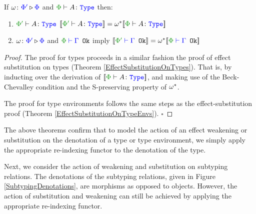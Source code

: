 \begin{framed}
    \begin{theorem}\label{EffectWeakeningOnTypes}  
        If $\omega \colon {\color{blue}\Phi'} \triangleright {\color {blue} \Phi}$ and $\wellformedtype{\P}{A}$ then:
        \begin{enumerate}[label=\roman*.]
            \item $\wellformedtype{\P'}{A}$ $\deno{\wellformedtype{\P'}{A}} = \w\star\deno{\wellformedtype{\P}{A}}$
            \item $\omega \colon {\color{blue}\Phi'} \triangleright {\color {blue} \Phi}$ and $\wellformedok{\P}{\G}$ imply $\deno{\wellformedok{\P'}{\G}} = \w\star\deno{\wellformedok{\P}{\G}}$
        \end{enumerate}        
    \end{theorem}
    

\begin{proof}
    The proof for types proceeds in a similar fashion the proof of effect substitution on types (Theorem \ref{EffectSubstitutionOnTypes}). That is, by inducting over the derivation of $\deno{\typerelation{\P}{A}{\type}}$, and making use of the Beck-Chevalley condition and the S-preserving property of $\omega^*$.
   
    The proof for type environments follows the same steps as the effect-substitution proof (Theorem \ref{EffectSubstitutionOnTypeEnvs}). $\square$
\end{proof}
\end{framed}

The above theorems confirm that to model the action of  an effect weakening or substitution on the denotation of a type or type environment, we simply apply the appropriate re-indexing functor to the denotation of the type.

Next, we consider the action of weakening and substitution on subtyping relations. The denotations of the subtyping relations, given in Figure \ref{SubtypingDenotations}, are morphisms as opposed to objects. However, the action of substitution and weakening can still be achieved by applying the appropriate re-indexing functor.


